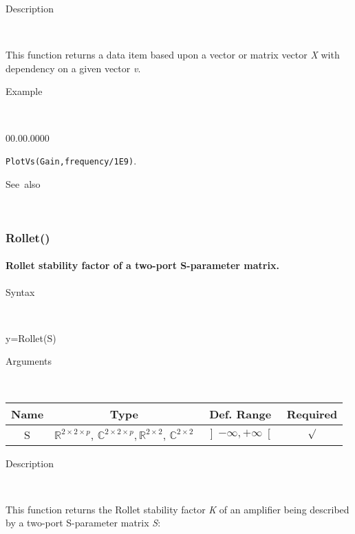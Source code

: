 \begin{description}
\item [Description]~
\end{description}
This function returns a data item based upon a vector or matrix vector
\textit{X} with dependency on a given vector \textit{v}. 

\begin{description}
\item [Example]~
\end{description}
\begin{lyxlist}{00.00.0000}
\item [\texttt{PlotVs(Gain,frequency/1E9)}.]~
\end{lyxlist}
\begin{description}
\item [See~also]~
\end{description}

\newpage
\subsubsection*{\hypertarget{Rollet}{}{\Large Rollet()}}


\paragraph{\label{par:Rollet-stability-factor}Rollet stability factor of a
two-port S-parameter matrix.}

\begin{description}
\item [Syntax]~
\end{description}
y=Rollet(S)

\begin{description}
\item [Arguments]~
\end{description}
\begin{tabular}{|c|c|c|c|}
\hline 
Name&
Type&
Def. Range&
Required\tabularnewline
\hline
\hline 
S&
$\mathbb{R}^{2\times2\times p}$, $\mathbb{C}^{2\times2\times p},$$\mathbb{R}^{2\times2}$,
$\mathbb{C}^{2\times2}$&
$\left]-\infty,+\infty\right[$&
$\surd$\tabularnewline
\hline
\end{tabular}

\begin{description}
\item [Description]~
\end{description}
This function returns the Rollet stability factor \textit{K} of an
amplifier being described by a two-port S-parameter matrix \textit{S}: 

